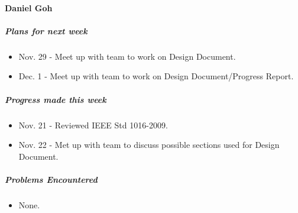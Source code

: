 {\vspace{3mm}

\paragraph{Daniel Goh}
\subparagraph{Plans for next week}
\begin{itemize}
  \item Nov. 29 - Meet up with team to work on Design Document.
  \item Dec. 1 - Meet up with team to work on Design Document/Progress Report.
\end{itemize}

\subparagraph{Progress made this week}
\begin{itemize}
  \item Nov. 21 - Reviewed IEEE Std 1016-2009.
  \item Nov. 22 - Met up with team to discuss possible sections used for Design Document.
\end{itemize}

\subparagraph{Problems Encountered}
\begin{itemize}
  \item None.
\end{itemize}

}

\newpage

